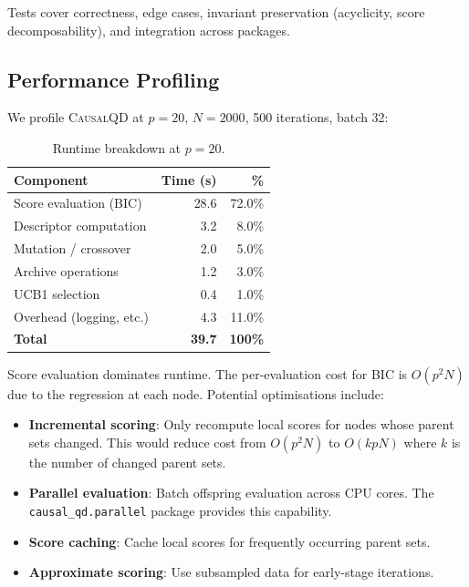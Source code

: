 \documentclass[11pt,a4paper]{article}
\begin{document}
Tests cover correctness, edge cases, invariant preservation (acyclicity, score decomposability), and integration across packages.

\subsection{Performance Profiling}

We profile \textsc{CausalQD} at $p = 20$, $N = 2000$, 500 iterations, batch 32:

\begin{table}[h]
\centering
\caption{Runtime breakdown at $p = 20$.}
\label{tab:profile}
\begin{tabular}{@{}lrr@{}}
\toprule
\textbf{Component} & \textbf{Time (s)} & \textbf{\%} \\
\midrule
Score evaluation (BIC) & 28.6 & 72.0\% \\
Descriptor computation & 3.2 & 8.0\% \\
Mutation / crossover & 2.0 & 5.0\% \\
Archive operations & 1.2 & 3.0\% \\
UCB1 selection & 0.4 & 1.0\% \\
Overhead (logging, etc.) & 4.3 & 11.0\% \\
\midrule
\textbf{Total} & \textbf{39.7} & \textbf{100\%} \\
\bottomrule
\end{tabular}
\end{table}

Score evaluation dominates runtime. The per-evaluation cost for BIC is $O(p^2 N)$ due to the regression at each node. Potential optimisations include:

\begin{itemize}[leftmargin=*]
    \item \textbf{Incremental scoring}: Only recompute local scores for nodes whose parent sets changed. This would reduce cost from $O(p^2 N)$ to $O(k p N)$ where $k$ is the number of changed parent sets.
    \item \textbf{Parallel evaluation}: Batch offspring evaluation across CPU cores. The \texttt{causal\_qd.parallel} package provides this capability.
    \item \textbf{Score caching}: Cache local scores for frequently occurring parent sets.
    \item \textbf{Approximate scoring}: Use subsampled data for early-stage iterations.
\end{itemize}
\end{document}
